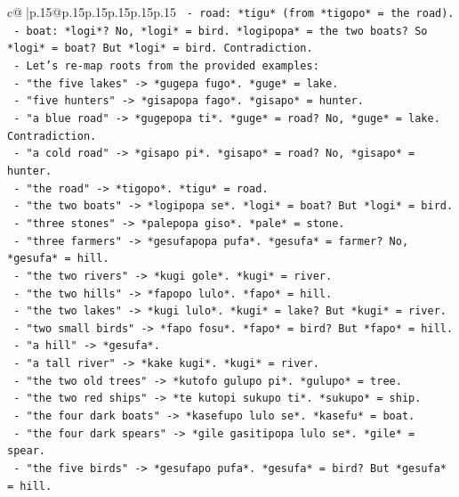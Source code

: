\documentclass{article}
\begin{document}
{\begin{supertabular}{c@{$\;$}|p{.15\linewidth}@{}p{.15\linewidth}p{.15\linewidth}p{.15\linewidth}p{.15\linewidth}p{.15\linewidth}}
{{{\texttt{  {-} road: *tigu* (from *tigopo* = the road).} \\
\texttt{  {-} boat: *logi*? No, *logi* = bird. *logipopa* = the two boats? So *logi* = boat? But *logi* = bird. Contradiction.} \\
\texttt{  {-} Let's re{-}map roots from the provided examples:} \\
\texttt{    {-} "the five lakes" {-}> *gugepa fugo*. *guge* = lake.} \\
\texttt{    {-} "five hunters" {-}> *gisapopa fago*. *gisapo* = hunter.} \\
\texttt{    {-} "a blue road" {-}> *gugepopa ti*. *guge* = road? No, *guge* = lake. Contradiction.} \\
\texttt{    {-} "a cold road" {-}> *gisapo pi*. *gisapo* = road? No, *gisapo* = hunter.} \\
\texttt{    {-} "the road" {-}> *tigopo*. *tigu* = road.} \\
\texttt{    {-} "the two boats" {-}> *logipopa se*. *logi* = boat? But *logi* = bird.} \\
\texttt{    {-} "three stones" {-}> *palepopa giso*. *pale* = stone.} \\
\texttt{    {-} "three farmers" {-}> *gesufapopa pufa*. *gesufa* = farmer? No, *gesufa* = hill.} \\
\texttt{    {-} "the two rivers" {-}> *kugi gole*. *kugi* = river.} \\
\texttt{    {-} "the two hills" {-}> *fapopo lulo*. *fapo* = hill.} \\
\texttt{    {-} "the two lakes" {-}> *kugi lulo*. *kugi* = lake? But *kugi* = river.} \\
\texttt{    {-} "two small birds" {-}> *fapo fosu*. *fapo* = bird? But *fapo* = hill.} \\
\texttt{    {-} "a hill" {-}> *gesufa*.} \\
\texttt{    {-} "a tall river" {-}> *kake kugi*. *kugi* = river.} \\
\texttt{    {-} "the two old trees" {-}> *kutofo gulupo pi*. *gulupo* = tree.} \\
\texttt{    {-} "the two red ships" {-}> *te kutopi sukupo ti*. *sukupo* = ship.} \\
\texttt{    {-} "the four dark boats" {-}> *kasefupo lulo se*. *kasefu* = boat.} \\
\texttt{    {-} "the four dark spears" {-}> *gile gasitipopa lulo se*. *gile* = spear.} \\
\texttt{    {-} "the five birds" {-}> *gesufapo pufa*. *gesufa* = bird? But *gesufa* = hill.} \\
}}}
\end{supertabular}}
\end{document}
